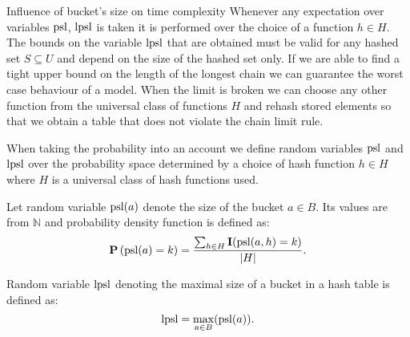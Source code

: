 \begin{section}{Influence of bucket's size on time complexity}
Whenever any expectation over variables $\mathrm{psl}$, $\mathrm{lpsl}$ is taken it is performed over the choice of a function $h \in H$. The bounds on the variable $\mathrm{lpsl}$ that are obtained must be valid for any hashed set $S \subseteq U$ and depend on the size of the hashed set only. If we are able to find a tight upper bound on the length of the longest chain we can guarantee the worst case behaviour of a model. When the limit is broken we can choose any other function from the universal class of functions $H$ and rehash stored elements so that we obtain a table that does not violate the chain limit rule.

When taking the probability into an account we define random variables $\mathrm{psl}$ and $\mathrm{lpsl}$ over the probability space determined by a choice of hash function $h \in H$ where $H$ is a universal class of hash functions used.

\begin{definition}
Let random variable $\mathrm{psl}(a)$ denote the size of the bucket $a \in B$. Its values are from $\mathbb{N}$ and probability density function is defined as:
\[
\mathbf{P}\left(\mathrm{psl}(a) = k\right) = \frac{\sum_{h \in H} \mathbf{I}(\mathrm{psl}(a, h) = k)}{|H|}\text{.}
\]

Random variable $\mathrm{lpsl}$ denoting the maximal size of a bucket in a hash table is defined as:
\[
\mathrm{lpsl} = \displaystyle\max_{a \in B}(\mathrm{psl}(a))\text{.}
\]
\end{definition}
\end{section}

